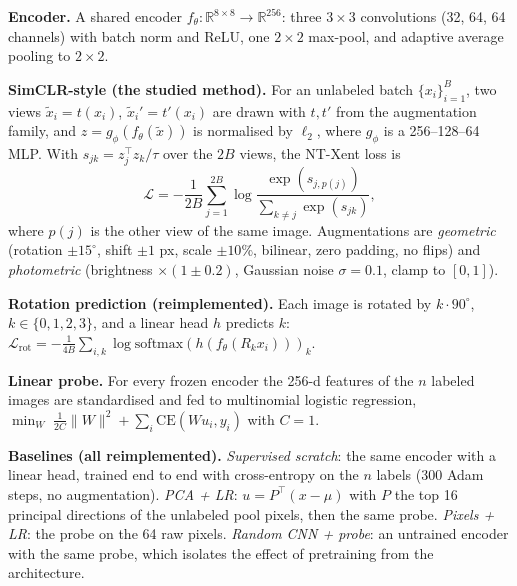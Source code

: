 \textbf{Encoder.} A shared encoder $f_\theta:\mathbb{R}^{8\times8}\to\mathbb{R}^{256}$: three $3\times3$ convolutions (32, 64, 64 channels) with batch norm and ReLU, one $2\times2$ max-pool, and adaptive average pooling to $2\times2$.

\textbf{SimCLR-style (the studied method).} For an unlabeled batch $\{x_i\}_{i=1}^B$, two views $\tilde x_i=t(x_i)$, $\tilde x_i'=t'(x_i)$ are drawn with $t,t'$ from the augmentation family, and $z=g_\phi(f_\theta(\tilde x))$ is normalised by $\ell_2$, where $g_\phi$ is a 256--128--64 MLP. With $s_{jk}=z_j^\top z_k/\tau$ over the $2B$ views, the NT-Xent loss is
\begin{equation}
\mathcal{L}=-\frac{1}{2B}\sum_{j=1}^{2B}\log\frac{\exp(s_{j,p(j)})}{\sum_{k\neq j}\exp(s_{jk})},
\end{equation}
where $p(j)$ is the other view of the same image. Augmentations are \emph{geometric} (rotation $\pm15^\circ$, shift $\pm1$ px, scale $\pm10\%$, bilinear, zero padding, no flips) and \emph{photometric} (brightness $\times(1\pm0.2)$, Gaussian noise $\sigma=0.1$, clamp to $[0,1]$).

\textbf{Rotation prediction (reimplemented).} Each image is rotated by $k\cdot90^\circ$, $k\in\{0,1,2,3\}$, and a linear head $h$ predicts $k$:
$\mathcal{L}_{\mathrm{rot}}=-\frac{1}{4B}\sum_{i,k}\log \mathrm{softmax}(h(f_\theta(R_k x_i)))_k$.

\textbf{Linear probe.} For every frozen encoder the 256-d features of the $n$ labeled images are standardised and fed to multinomial logistic regression, $\min_W \; \frac{1}{2C}\lVert W\rVert^2+\sum_i \mathrm{CE}(Wu_i,y_i)$ with $C=1$.

\textbf{Baselines (all reimplemented).} \emph{Supervised scratch}: the same encoder with a linear head, trained end to end with cross-entropy on the $n$ labels (300 Adam steps, no augmentation). \emph{PCA + LR}: $u=P^\top(x-\mu)$ with $P$ the top 16 principal directions of the unlabeled pool pixels, then the same probe. \emph{Pixels + LR}: the probe on the 64 raw pixels. \emph{Random CNN + probe}: an untrained encoder with the same probe, which isolates the effect of pretraining from the architecture.
